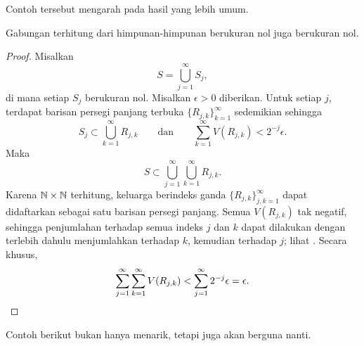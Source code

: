 Contoh tersebut mengarah pada hasil yang lebih umum.

\begin{prop}
Gabungan terhitung dari himpunan-himpunan berukuran nol juga berukuran nol.
\end{prop}

\begin{proof}
Misalkan
\begin{equation*}
S = \bigcup_{j=1}^\infty S_j ,
\end{equation*}
di mana setiap $S_j$ berukuran nol. Misalkan $\epsilon>0$ diberikan. Untuk
setiap $j$, terdapat barisan persegi panjang terbuka
$\{R_{j,k}\}_{k=1}^\infty$ sedemikian sehingga
\begin{equation*}
S_j \subset \bigcup_{k=1}^\infty R_{j,k}
\qquad \text{dan} \qquad
\sum_{k=1}^\infty V(R_{j,k}) < 2^{-j} \epsilon .
\end{equation*}
Maka
\begin{equation*}
S \subset \bigcup_{j=1}^\infty \bigcup_{k=1}^\infty R_{j,k} .
\end{equation*}
Karena ${\mathbb{N}}\times{\mathbb{N}}$ terhitung, keluarga berindeks ganda
$\{R_{j,k}\}_{j,k=1}^\infty$ dapat didaftarkan sebagai satu barisan persegi
panjang. Semua $V(R_{j,k})$ tak negatif, sehingga penjumlahan terhadap semua
indeks $j$ dan $k$ dapat dilakukan dengan terlebih dahulu menjumlahkan terhadap
$k$, kemudian terhadap $j$; lihat
.
Secara khusus,
\begin{equation*}
\sum_{j=1}^\infty \sum_{k=1}^\infty V(R_{j,k}) <
\sum_{j=1}^\infty 2^{-j} \epsilon = \epsilon . \qedhere
\end{equation*}
\end{proof}

Contoh berikut bukan hanya menarik, tetapi juga akan berguna nanti.

